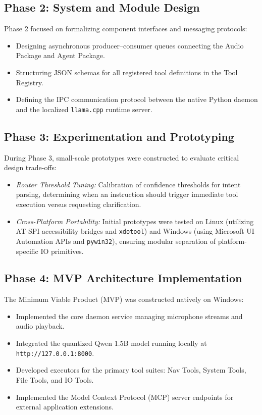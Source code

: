 \documentclass[12pt,a4paper]{report}
\begin{document}
\subsection{Phase 2: System and Module Design}
Phase 2 focused on formalizing component interfaces and messaging protocols:
\begin{itemize}
    \item Designing asynchronous producer--consumer queues connecting the Audio Package and Agent Package.
    \item Structuring JSON schemas for all registered tool definitions in the Tool Registry.
    \item Defining the IPC communication protocol between the native Python daemon and the localized \texttt{llama.cpp} runtime server.
\end{itemize}

\subsection{Phase 3: Experimentation and Prototyping}
During Phase 3, small-scale prototypes were constructed to evaluate critical design trade-offs:
\begin{itemize}
    \item \textit{Router Threshold Tuning:} Calibration of confidence thresholds for intent parsing, determining when an instruction should trigger immediate tool execution versus requesting clarification.
    \item \textit{Cross-Platform Portability:} Initial prototypes were tested on Linux (utilizing AT-SPI accessibility bridges and \texttt{xdotool}) and Windows (using Microsoft UI Automation APIs and \texttt{pywin32}), ensuring modular separation of platform-specific IO primitives.
\end{itemize}

\subsection{Phase 4: MVP Architecture Implementation}
The Minimum Viable Product (MVP) was constructed natively on Windows:
\begin{itemize}
    \item Implemented the core daemon service managing microphone streams and audio playback.
    \item Integrated the quantized Qwen 1.5B model running locally at \texttt{http://127.0.0.1:8000}.
    \item Developed executors for the primary tool suites: Nav Tools, System Tools, File Tools, and IO Tools.
    \item Implemented the Model Context Protocol (MCP) server endpoints for external application extensions.
\end{itemize}
\end{document}

